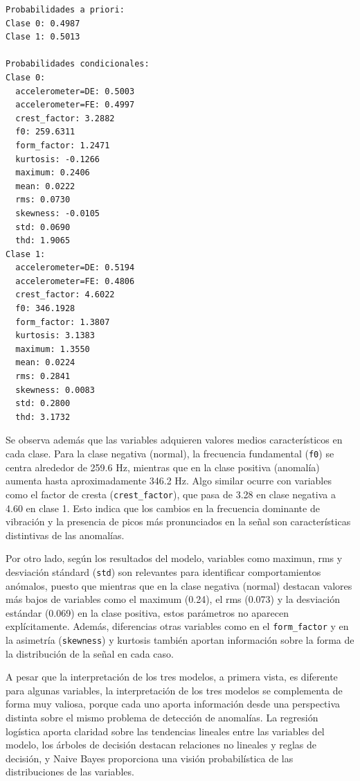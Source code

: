 \documentclass[11pt,a4paper,spanish]{book}
\numberwithin{equation}{chapter}
\numberwithin{figure}{chapter}
\begin{document}
\vspace{5mm}
\begin{lstlisting}[language={}, basicstyle=\ttfamily\footnotesize\color{black}, frame=lines]
Probabilidades a priori:
Clase 0: 0.4987
Clase 1: 0.5013

Probabilidades condicionales:
Clase 0:
  accelerometer=DE: 0.5003
  accelerometer=FE: 0.4997
  crest_factor: 3.2882
  f0: 259.6311
  form_factor: 1.2471
  kurtosis: -0.1266
  maximum: 0.2406
  mean: 0.0222
  rms: 0.0730
  skewness: -0.0105
  std: 0.0690
  thd: 1.9065
Clase 1:
  accelerometer=DE: 0.5194
  accelerometer=FE: 0.4806
  crest_factor: 4.6022
  f0: 346.1928
  form_factor: 1.3807
  kurtosis: 3.1383
  maximum: 1.3550
  mean: 0.0224
  rms: 0.2841
  skewness: 0.0083
  std: 0.2800
  thd: 3.1732
\end{lstlisting}



Se observa además que las variables adquieren valores medios característicos en cada 
clase. Para la clase negativa (normal), la frecuencia fundamental (\lstinline|f0|) se 
centra alrededor de 259.6 Hz, mientras que en la clase positiva (anomalía) aumenta hasta 
aproximadamente 346.2 Hz. 
Algo similar ocurre con variables como el factor de cresta (\lstinline|crest_factor|), 
que pasa de 3.28 en clase negativa a 4.60 en clase 1. Esto indica que los cambios en la 
frecuencia dominante de vibración y la  presencia de picos más pronunciados en la señal 
son características distintivas de las anomalías.


Por otro lado, según los resultados del modelo, variables como maximun, rms y desviación 
stándard (\lstinline|std|) son relevantes para identificar comportamientos anómalos, 
puesto que mientras que en la clase negativa (normal) destacan valores más bajos de 
variables como el maximum (0.24), el rms (0.073) y la desviación estándar (0.069) en la 
clase positiva, estos parámetros no aparecen explícitamente. Además, diferencias otras 
variables como en el \lstinline|form_factor| y en la asimetría (\lstinline|skewness|) y 
kurtosis también aportan información sobre la forma de la distribución de la señal en 
cada caso.


A pesar que la interpretación de los tres modelos, a primera vista, es diferente para 
algunas variables, la interpretación de los tres modelos se complementa de forma muy 
valiosa, porque cada uno aporta información desde una perspectiva distinta sobre el 
mismo problema de detección de anomalías. La regresión logística aporta claridad sobre 
las tendencias lineales entre las variables del modelo, los árboles de decisión destacan 
relaciones no lineales y reglas de decisión, y Naive Bayes proporciona una visión 
probabilística de las distribuciones de las variables. 
\end{document}
